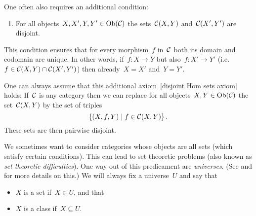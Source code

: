 \begin{remark*}
  \label{disjoint Hom sets}
  One often also requires an additional condition:
  \begin{enumerate}[label=(C\arabic*),start=3]
    \item
      \label{disjoint Hom sets axiom}
      For all objects~$X, X', Y, Y' \in \operatorname{Ob}(\mathcal{C})$ the sets~$\mathcal{C}(X,Y)$ and~$\mathcal{C}(X',Y')$ are disjoint.
  \end{enumerate}
  This condition ensures that for every morphism~$f$ in~$\mathcal{C}$ both its domain and codomain are unique.
  In other words, if~$f \colon X \to Y$ but also~$f \colon X' \to Y'$ (i.e.~$f \in \mathcal{C}(X,Y) \cap \mathcal{C}(X',Y')$) then already~$X = X'$ and~$Y = Y'$.
  
  One can always assume that this additional axiom~\ref*{disjoint Hom sets axiom} holds:
  If~$\mathcal{C}$ is any category then we can replace for all objects~$X, Y \in \operatorname{Ob}(\mathcal{C})$ the set~$\mathcal{C}(X,Y)$ by the set of triples
  \[
    \{
      (X,f,Y)
    \suchthat
      f \in \Ccat(X,Y)
    \}  \,.
  \]
  These sets are then pairwise disjoint.
\end{remark*}


\begin{remark}
  We sometimes want to consider categories whose objects are all sets (which satisfy certain conditions).
  This can lead to set theoretic problems (also known as \emph{set theoretic difficulties}).
  One way out of this predicament are \emph{universes}.
  (See \cite[I.6]{Working} and \cite[3.2]{Schubert} for more details on this.)
  We will always fix a universe~$U$ and say that
  \begin{itemize}
    \item
      $X$ is a set if~$X \in U$, and that
    \item
      $X$ is a class if~$X \subseteq U$.
  \end{itemize}
\end{remark}









